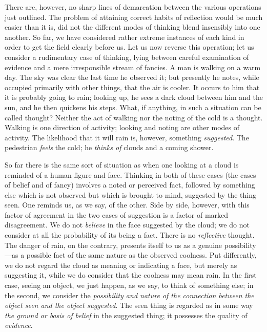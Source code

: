 \documentclass[letterpaper]{book}
\begin{document}
There are, however, no sharp lines of demarcation between the various
operations just outlined. The problem of attaining correct habits of
reflection would be much easier than it is, did not the different modes
of thinking blend insensibly into one another. So far, we have
considered rather extreme instances of each kind in order to get the
field clearly before us. Let us now reverse this operation; let us
consider a rudimentary case of thinking, lying between careful
examination of evidence and a mere irresponsible stream of fancies. A
man is walking on a warm day. The sky was clear the last time he
observed it; but presently he notes, while occupied primarily with other
things, that the air is cooler. It occurs to him that it is probably
going
to
rain; looking up, he sees a dark cloud between him and the sun, and he
then quickens his steps. What, if anything, in such a situation can be
called thought? Neither the act of walking nor the noting of the cold is
a thought. Walking is one direction of activity; looking and noting are
other modes of activity. The likelihood that it will rain is, however,
something \emph{suggested}. The pedestrian \emph{feels} the cold; he
\emph{thinks of} clouds and a coming shower.



So far there is the same sort of situation as when one looking at a
cloud is reminded of a human figure and face. Thinking in both of these
cases (the cases of belief and of fancy) involves a noted or perceived
fact, followed by something else which is not observed but which is
brought to mind, suggested by the thing seen. One reminds us, as we say,
of the other. Side by side, however, with this factor of agreement in
the two cases of suggestion is a factor of marked disagreement. We do
not \emph{believe} in the face suggested by the cloud; we do not
consider at all the probability of its being a fact. There is no
\emph{reflective} thought. The danger of rain, on the contrary, presents
itself to us as a genuine possibility---as a possible fact of the same
nature as the observed coolness. Put differently, we do not regard the
cloud as meaning or indicating a face, but merely as suggesting it,
while we do consider that the coolness may mean rain. In the first case,
seeing an object, we just happen, as we say, to think of something else;
in the second, we consider the \emph{possibility and nature of the
connection between the object seen and the object suggested}. The seen
thing is regarded as in some way \emph{the ground or basis of belief} in
the suggested thing; it possesses the quality of
\emph{evidence}.
\end{document}
